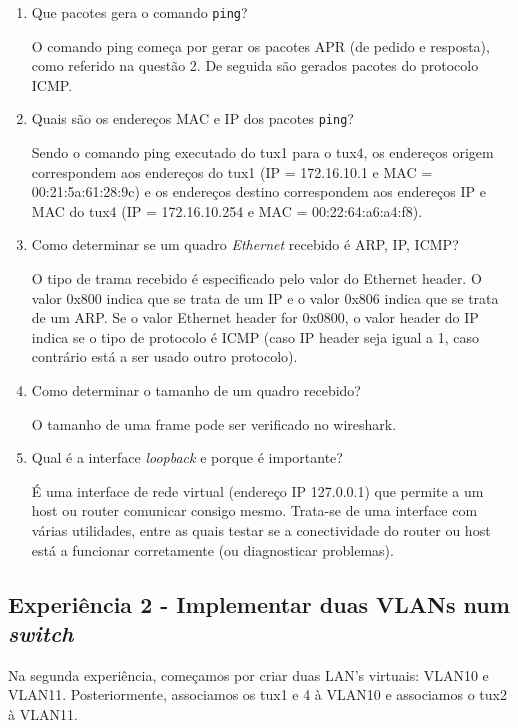 \documentclass{article}
\begin{document}
\begin{enumerate}
\item Que pacotes gera o comando \texttt{ping}?

O comando ping começa por gerar os pacotes APR (de pedido e resposta), como referido na questão 2. De seguida são gerados pacotes do protocolo ICMP.

\item Quais são os endereços MAC e IP dos pacotes \texttt{ping}?

Sendo o comando ping executado do tux1 para o tux4, os endereços origem correspondem aos endereços do tux1 (IP = 172.16.10.1 e MAC = 00:21:5a:61:28:9c) e os endereços destino correspondem aos endereços IP e MAC do tux4 (IP = 172.16.10.254 e MAC = 00:22:64:a6:a4:f8).

\item Como determinar se um quadro \textit{Ethernet} recebido é ARP, IP, ICMP?

O tipo de trama recebido é especificado pelo valor do Ethernet header. O valor 0x800 indica que se trata de um IP e o valor 0x806 indica que se trata de um ARP.
Se o valor Ethernet header for 0x0800,  o valor header do IP indica se o tipo de protocolo é ICMP (caso IP header seja igual a 1, caso contrário está a ser usado outro protocolo).

\item Como determinar o tamanho de um quadro recebido?

O tamanho de uma frame pode ser verificado no wireshark.

\item Qual é a interface \textit{loopback} e porque é importante?

É uma interface de rede virtual (endereço IP 127.0.0.1) que permite a um host ou router comunicar consigo mesmo. Trata-se de uma interface com várias utilidades, entre as quais testar se a conectividade do router ou host está a funcionar corretamente (ou diagnosticar problemas).
\end{enumerate}
\subsection{Experiência 2 - Implementar duas VLANs num \textit{switch}}

Na segunda experiência, começamos por criar duas LAN’s virtuais: VLAN10 e VLAN11. Posteriormente, associamos os tux1 e 4 à VLAN10 e associamos o tux2 à VLAN11.
\end{document}
